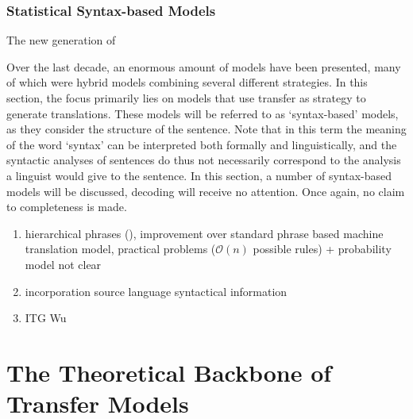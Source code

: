 \documentclass{report}
\theoremstyle{indented}
\begin{document}
\subsection{Statistical Syntax-based Models}

The new generation of 

Over the last decade, an enormous amount of models have been presented, many of which were hybrid models combining several different strategies. In this section, the focus primarily lies on models that use transfer as strategy to generate translations. These models will be referred to as `syntax-based' models, as they consider the structure of the sentence. Note that in this term the meaning of the word `syntax' can be interpreted both formally and linguistically, and the syntactic analyses of sentences do thus not necessarily correspond to the analysis a linguist would give to the sentence. In this section, a number of syntax-based models will be discussed, decoding will receive no attention. Once again, no claim to completeness is made. 



\begin{enumerate}
\item hierarchical phrases (\cite{chiang2005hierarchical}), improvement over standard phrase based machine translation model, practical problems ($\mathcal{O}(n)$ possible rules) + probability model not clear
\item incorporation source language syntactical information
\item ITG Wu
\end{enumerate}

\chapter{The Theoretical Backbone of Transfer Models}
\end{document}
